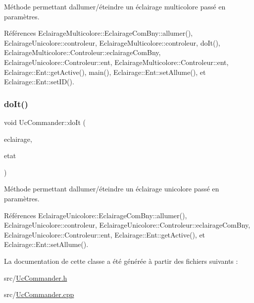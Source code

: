 Méthode permettant d\textquotesingle{}allumer/éteindre un éclairage multicolore passé en paramètres. 

Références Eclairage\+Multicolore\+::\+Eclairage\+Com\+Bny\+::allumer(), Eclairage\+Unicolore\+::controleur, Eclairage\+Multicolore\+::controleur, do\+It(), Eclairage\+Multicolore\+::\+Controleur\+::eclairage\+Com\+Bny, Eclairage\+Unicolore\+::\+Controleur\+::ent, Eclairage\+Multicolore\+::\+Controleur\+::ent, Eclairage\+::\+Ent\+::get\+Active(), main(), Eclairage\+::\+Ent\+::set\+Allume(), et Eclairage\+::\+Ent\+::set\+I\+D().

\mbox{\label{classUcCommander_a3f58b4a5484c34d0f99f2b154ea0261b}} 
\subsubsection{\texorpdfstring{do\+It()}{doIt()}\hspace{0.1cm}{\footnotesize\ttfamily [2/2]}}
{\footnotesize\ttfamily void Uc\+Commander\+::do\+It (\begin{DoxyParamCaption}\item[{\hyperlink{classEclairageUnicolore}{Eclairage\+Unicolore} \&}]{eclairage,  }\item[{bool}]{etat }\end{DoxyParamCaption})}

Méthode permettant d\textquotesingle{}allumer/éteindre un éclairage unicolore passé en paramètres. 

Références Eclairage\+Unicolore\+::\+Eclairage\+Com\+Bny\+::allumer(), Eclairage\+Unicolore\+::controleur, Eclairage\+Unicolore\+::\+Controleur\+::eclairage\+Com\+Bny, Eclairage\+Unicolore\+::\+Controleur\+::ent, Eclairage\+::\+Ent\+::get\+Active(), et Eclairage\+::\+Ent\+::set\+Allume().



La documentation de cette classe a été générée à partir des fichiers suivants \+:\begin{DoxyCompactItemize}
\item 
src/\hyperlink{UcCommander_8h}{Uc\+Commander.\+h}\item 
src/\hyperlink{UcCommander_8cpp}{Uc\+Commander.\+cpp}\end{DoxyCompactItemize}
